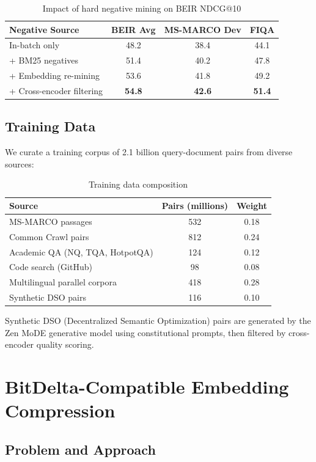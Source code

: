 \documentclass[11pt,a4paper]{article}
\begin{document}
\begin{table}[H]
\centering
\caption{Impact of hard negative mining on BEIR NDCG@10}
\label{tab:hard_neg}
\begin{tabular}{lccc}
\toprule
Negative Source & BEIR Avg & MS-MARCO Dev & FIQA \\
\midrule
In-batch only & 48.2 & 38.4 & 44.1 \\
+ BM25 negatives & 51.4 & 40.2 & 47.8 \\
+ Embedding re-mining & 53.6 & 41.8 & 49.2 \\
+ Cross-encoder filtering & \textbf{54.8} & \textbf{42.6} & \textbf{51.4} \\
\bottomrule
\end{tabular}
\end{table}

\subsection{Training Data}

We curate a training corpus of 2.1 billion query-document pairs from diverse sources:

\begin{table}[H]
\centering
\caption{Training data composition}
\label{tab:training_data}
\begin{tabular}{lcc}
\toprule
Source & Pairs (millions) & Weight \\
\midrule
MS-MARCO passages & 532 & 0.18 \\
Common Crawl pairs & 812 & 0.24 \\
Academic QA (NQ, TQA, HotpotQA) & 124 & 0.12 \\
Code search (GitHub) & 98 & 0.08 \\
Multilingual parallel corpora & 418 & 0.28 \\
Synthetic DSO pairs & 116 & 0.10 \\
\bottomrule
\end{tabular}
\end{table}

Synthetic DSO (Decentralized Semantic Optimization) pairs are generated by the Zen MoDE generative model using constitutional prompts, then filtered by cross-encoder quality scoring.

\section{BitDelta-Compatible Embedding Compression}

\subsection{Problem and Approach}
\end{document}
